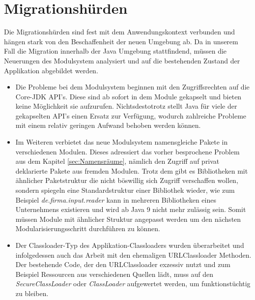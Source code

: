 \section{Migrationshürden} \label{MigH}

	Die Migrationshürden sind fest mit dem Anwendungskontext verbunden und hängen stark von den Beschaffenheit der neuen Umgebung ab. Da in unserem Fall die Migration innerhalb der Java Umgebung stattfindend, müssen die Neuerungen des Modulsystem analysiert und auf die bestehenden Zustand der Applikation abgebildet werden.\bigbreak

\begin{itemize}
	\item Die Probleme bei dem Modulsystem beginnen mit den Zugriffsrechten auf die Core-JDK API's. Diese sind ab sofort in dem Module gekapselt und bieten keine Möglichkeit sie aufzurufen. Nichtsdestotrotz stellt Java für viele der gekapselten API's einen Ersatz zur Verfügung, wodurch zahlreiche Probleme mit einem relativ geringen Aufwand behoben werden können. 


	\item Im Weiteren verbietet das neue Modulsystem namensgleiche Pakete in verschiedenen Modulen. Dieses adressiert das vorher besprochene Problem aus dem Kapitel \ref{sec:Namensräume}, nämlich den Zugriff auf privat deklarierte Pakete aus fremden Modulen. Trotz dem gibt es Bibliotheken mit ähnlicher Paketstruktur die nicht böswillig sich Zugriff verschaffen wollen, sondern spiegeln eine Standardstruktur einer Bibliothek wieder, wie zum Beispiel \textit{de.firma.input.reader} kann in mehreren Bibliotheken eines Unternehmens existieren und wird ab Java 9 nicht mehr zulässig sein. Somit müssen Module mit ähnlicher Struktur angepasst werden um den nächsten Modularisierungsschritt durchführen zu können.


	\item Der Classloader-Typ des Applikation-Classloaders wurden überarbeitet und infolgedessen auch das Arbeit mit den ehemaligen URLClassloader Methoden. Der bestehende Code, der den URLClassloader exzessiv nutzt und zum Beispiel Ressourcen aus verschiedenen Quellen lädt, muss auf den \textit{SecureClassLoader} oder  \textit{ClassLoader} aufgewertet werden, um funktionstüchtig zu bleiben. 



\end{itemize}

